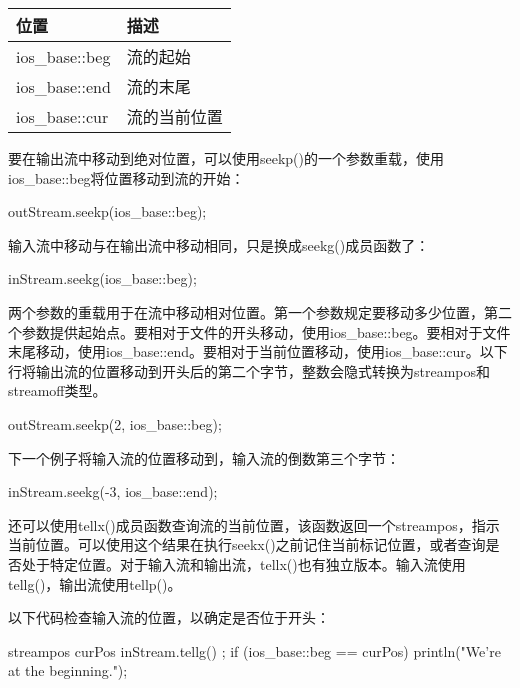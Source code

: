 \begin{longtable}{|l|l|}
\hline
\textbf{位置} & \textbf{描述}               \\ \hline
\endfirsthead
%
\endhead
%
ios\_base::beg    & 流的起始       \\ \hline
ios\_base::end    & 流的末尾              \\ \hline
ios\_base::cur    & 流的当前位置 \\ \hline
\end{longtable}

要在输出流中移动到绝对位置，可以使用seekp()的一个参数重载，使用ios\_base::beg将位置移动到流的开始：

\begin{cpp}
outStream.seekp(ios_base::beg);
\end{cpp}

输入流中移动与在输出流中移动相同，只是换成seekg()成员函数了：

\begin{cpp}
inStream.seekg(ios_base::beg);
\end{cpp}

两个参数的重载用于在流中移动相对位置。第一个参数规定要移动多少位置，第二个参数提供起始点。要相对于文件的开头移动，使用ios\_base::beg。要相对于文件末尾移动，使用ios\_base::end。要相对于当前位置移动，使用ios\_base::cur。以下行将输出流的位置移动到开头后的第二个字节，整数会隐式转换为streampos和streamoff类型。

\begin{cpp}
outStream.seekp(2, ios_base::beg);
\end{cpp}

下一个例子将输入流的位置移动到，输入流的倒数第三个字节：

\begin{cpp}
inStream.seekg(-3, ios_base::end);
\end{cpp}

还可以使用tellx()成员函数查询流的当前位置，该函数返回一个streampos，指示当前位置。可以使用这个结果在执行seekx()之前记住当前标记位置，或者查询是否处于特定位置。对于输入流和输出流，tellx()也有独立版本。输入流使用tellg()，输出流使用tellp()。

以下代码检查输入流的位置，以确定是否位于开头：

\begin{cpp}
streampos curPos { inStream.tellg() };
if (ios_base::beg == curPos) {
    println("We're at the beginning.");
}
\end{cpp}

